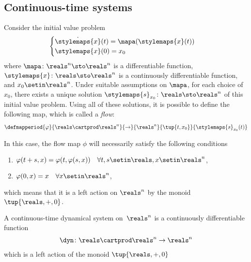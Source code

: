 \subsection{Continuous-time systems}

Consider the initial value problem
\begin{equation}
    \begin{cases}
        \dot{\stylemaps{x}}(t) = \mapa(\stylemaps{x}(t)) \\
        \stylemaps{x}(0) = x_0
    \end{cases}
\end{equation}
where $\mapa \colon \reals^n \sto \reals^n$ is a differentiable function, $\stylemaps{x} \colon \reals \sto \reals^n$ is a continuously differentiable function, and $x_0 \setin \reals^n$.
Under suitable assumptions on $\mapa$, for each choice of $x_0$, there exists a unique solution $\stylemaps{s}_{x_0} \colon \reals \sto \reals^n$ of this initial value problem.
Using all of these solutions, it is possible to define the following map, which is called a \emph{flow}:
\begin{equation}
    \defmapperiod{
        \varphi
    }{
        \reals \cartprod \reals^n
    }{
        \to
    }{
        \reals^n
    }{
        \tup{t,x_0}
    }{
        \stylemaps{s}_{x_0}(t)
    }
\end{equation}

In this case, the flow map $\phi$ will necessarily satisfy the following conditions
\begin{enumerate}
    \item $\varphi(t + s, x) = \varphi(t, \varphi(s,x)) \quad \forall t, s \setin \reals, x \setin \reals^n$,
    \item $\varphi(0, x) = x \quad \forall x \setin \reals^n$,
\end{enumerate}
which means that it is a left action on $\reals^n$ by the monoid $\tup{\reals, +, 0}$.


\begin{definition}
    \label{def:ct-dynsyst}
    A continuous-time dynamical system on~$\reals^n$ is a continuously differentiable function
    \begin{equation}
        \dyn \colon \reals \cartprod \reals^n \to \reals^n
    \end{equation}
    which is a left action of the monoid $\tup{\reals, +, 0}$
\end{definition}

